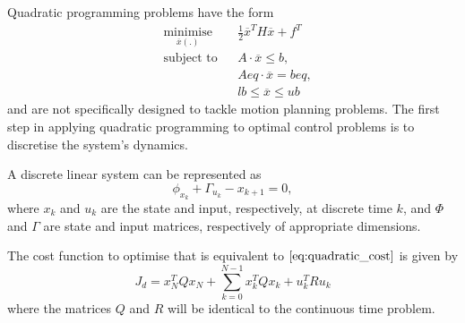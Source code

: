 \par Quadratic programming problems have the form
\begin{equation}
    \label{eq:gen_quad_prog}
    \begin{aligned}
    & \underset{\overline{x}(.)}{\text{minimise}} && \frac{1}{2} \overline{x}^T H \overline{x} + f^T  \\
    & \text{subject to} && A \cdot \overline{x} \leq b, \\
    & && Aeq \cdot \overline{x} = beq, \\
    & && lb \leq \overline{x} \leq ub
    \end{aligned}
\end{equation} 
and are not specifically designed to tackle motion planning problems. The first step in applying quadratic programming to optimal control problems is to discretise the system's dynamics. 
\par A discrete linear system can be represented as
\begin{equation}
    \label{eq:discrete_state_space} 
    \phi_{x_k} + \Gamma_{u_k} - x_{k+1} = 0,
\end{equation}
where $x_k$ and $u_k$ are the state and input, respectively, at discrete time $k$, and $\Phi$ and $\Gamma$ are state and input matrices, respectively of appropriate dimensions.
\par The cost function to optimise that is equivalent to $\ref{eq:quadratic_cost}$ is given by
\begin{equation}
    J_d = x_N^T Q x_N + \sum_{k=0}^{N-1} x_k^T Q x_k + u_k^T R u_k
    \label{eq:discrete_quad_cost}
\end{equation}
where the matrices $Q$ and $R$ will be identical to the continuous time problem.

